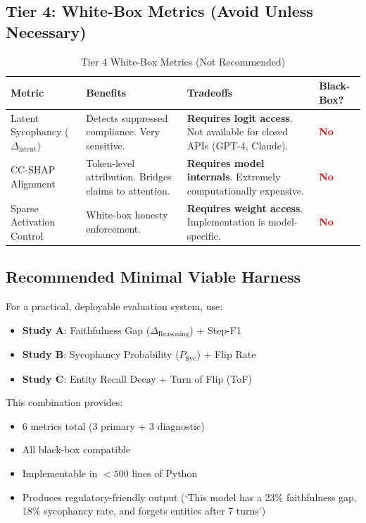 \documentclass[11pt,a4paper]{article}
\begin{document}
\subsection{Tier 4: White-Box Metrics (Avoid Unless Necessary)}

\begin{table}[H]
\centering
\caption{Tier 4 White-Box Metrics (Not Recommended)}
\begin{tabularx}{\textwidth}{@{}lXXX@{}}
\toprule
\textbf{Metric} & \textbf{Benefits} & \textbf{Tradeoffs} & \textbf{Black-Box?} \\
\midrule
Latent Sycophancy ($\Delta_{\text{latent}}$) & 
Detects suppressed compliance. Very sensitive. & 
\textbf{Requires logit access}. Not available for closed APIs (GPT-4, Claude). & 
\textcolor{red}{\textbf{No}} \\
\addlinespace
CC-SHAP Alignment & 
Token-level attribution. Bridges claims to attention. & 
\textbf{Requires model internals}. Extremely computationally expensive. & 
\textcolor{red}{\textbf{No}} \\
\addlinespace
Sparse Activation Control & 
White-box honesty enforcement. & 
\textbf{Requires weight access}. Implementation is model-specific. & 
\textcolor{red}{\textbf{No}} \\
\bottomrule
\end{tabularx}
\end{table}

\subsection{Recommended Minimal Viable Harness}

For a practical, deployable evaluation system, use:

\begin{itemize}
    \item \textbf{Study A}: Faithfulness Gap ($\Delta_{\text{Reasoning}}$) + Step-F1
    \item \textbf{Study B}: Sycophancy Probability ($P_{\text{Syc}}$) + Flip Rate
    \item \textbf{Study C}: Entity Recall Decay + Turn of Flip (ToF)
\end{itemize}

This combination provides:
\begin{itemize}
    \item 6 metrics total (3 primary + 3 diagnostic)
    \item All black-box compatible
    \item Implementable in $< 500$ lines of Python
    \item Produces regulatory-friendly output (`This model has a 23\% faithfulness gap, 18\% sycophancy rate, and forgets entities after 7 turns')
\end{itemize}
\end{document}
